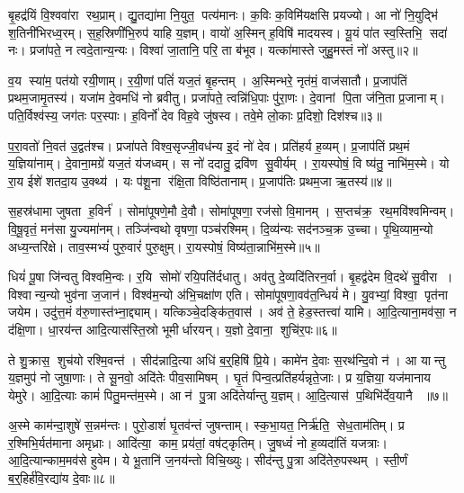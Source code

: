 बृ॒हद्र॑यिं वि॒श्ववा॑रा रथ॒प्राम्।
द्यु॒तद्या॑मा नि॒युत॒ पत्य॑मानः।
क॒विः क॒विमि॑यक्षसि प्रयज्यो।
आ नो॑ नि॒युद्भि॑ श॒तिनी॑भिरध्व॒रम्।
स॒ह॒स्रिणी॑भि॒रुप॑ याहि य॒ज्ञम्।
वायो॑ अ॒स्मिन् ह॒विषि॑ मादयस्व।
यू॒यं पा॑त स्व॒स्तिभि॒ सदा॑ नः।
प्रजा॑पते॒ न त्वदे॒तान्य॒न्यः।
विश्वा॑ जा॒तानि॒ परि॒ ता ब॑भूव।
यत्का॑मास्ते जुहु॒मस्तं नो॑ अस्तु॥२॥

व॒य स्या॑म॒ पत॑यो रयी॒णाम्।
र॒यी॒णां पतिं॑ यज॒तं बृ॒हन्तम्।
अ॒स्मिन्भरे॒ नृत॑मं॒ वाज॑सातौ।
प्र॒जाप॑तिं प्रथम॒जामृ॒तस्य॑।
यजा॑म दे॒वमधि॑ नो ब्रवीतु।
प्रजा॑पते॒ त्वन्नि॑धि॒पाः पु॑रा॒णः।
दे॒वानां पि॒ता ज॑नि॒ता प्र॒जानाम्।
पति॒र्विश्व॑स्य॒ जग॑तः पर॒स्पाः।
ह॒विर्नो॑ देव विह॒वे जु॑षस्व।
तवे॒मे लो॒काः प्र॒दिशो॒ दिश॑श्च॥३॥

प॒रा॒वतो॑ नि॒वत॑ उ॒द्वत॑श्च।
प्रजा॑पते विश्व॒सृज्जी॒वध॑न्य इ॒दं नो॑ देव।
प्रति॑हर्य ह॒व्यम्।
प्र॒जाप॑तिं प्रथ॒मं य॒ज्ञिया॑नाम्।
दे॒वाना॒मग्रे॑ यज॒तं य॑जध्वम्।
स नो॑ ददातु॒ द्रवि॑ण सु॒वीर्यम्।
रा॒यस्पोषं॒ वि ष्य॑तु॒ नाभि॑म॒स्मे।
यो रा॒य ईशे॑ शतदा॒य उ॒क्थ्य॑।
यः प॑शू॒ना र॑क्षि॒ता विष्ठि॑तानाम्।
प्र॒जाप॑तिः प्रथम॒जा ऋ॒तस्य॑॥४॥

स॒हस्र॑धामा जुषता ह॒विर्न॑।
सोमा॑पूषणे॒मौ दे॒वौ।
सोमा॑पूषणा॒ रज॑सो वि॒मानम्।
स॒प्तच॑क्र॒ रथ॒मवि॑श्वमिन्वम्।
वि॒षू॒वृतं॒ मन॑सा यु॒ज्यमा॑नम्।
तञ्जि॑न्वथो वृषणा॒ पञ्च॑रश्मिम्।
दि॒व्य॑न्यः सद॑नञ्च॒क्र उ॒च्चा।
पृ॒थि॒व्याम॒न्यो अध्य॒न्तरि॑क्षे।
ताव॒स्मभ्यं॑ पुरु॒वारं॑ पुरु॒क्षुम्।
रा॒यस्पोषं॒ विष्य॑ता॒न्नाभि॑म॒स्मे॥५॥

धियं॑ पू॒षा जि॑न्वतु विश्वमि॒न्वः।
र॒यि सोमो॑ रयि॒पति॑र्दधातु।
अव॑तु दे॒व्यदि॑तिरन॒र्वा।
बृ॒हद्व॑देम वि॒दथे॑ सु॒वीरा।
विश्वान्य॒न्यो भुव॑ना ज॒जान॑।
विश्व॑म॒न्यो अ॑भि॒चक्षा॑ण एति।
सोमा॑पूषणा॒वव॑त॒न्धियं॑ मे।
यु॒वभ्यां॒ विश्वा॒ पृत॑ना जयेम।
उदु॑त्त॒मं व॑रु॒णास्त॑भ्ना॒द्द्याम्।
यत्किञ्चे॒दङ्कि॑त॒वास॑।
अव॑ ते॒ हेड॒स्तत्त्वा॑ यामि।
आ॒दि॒त्याना॒मव॑सा॒ न द॑क्षि॒णा।
धा॒रय॑न्त आदि॒त्यास॑स्ति॒स्रो भूमीर्धारयन्।
य॒ज्ञो दे॒वाना॒ शुचि॑र॒पः॥६॥\anuvakamend[म॒नी॒षाऽस्तु॑ च॒र्तस्या॒स्मे कि॑त॒वास॑श्च॒त्वारि॑ च]

ते शु॒क्रास॒ शुच॑यो रश्मि॒वन्त॑।
सीद॑न्नादि॒त्या अधि॑ ब॒र्॒हिषि॑ प्रि॒ये।
कामे॑न दे॒वाः स॒रथ॑न्दि॒वो न॑।
आ यान्तु य॒ज्ञमुप॑ नो जुषा॒णाः।
ते सू॒नवो॒ अदि॑तेः पीव॒सामिषम्।
घृ॒तं पिन्व॒त्प्रति॑हर्यन्नृते॒जाः।
प्र य॒ज्ञिया॒ यज॑मानाय येमुरे।
आ॒दि॒त्याः कामं॑ पितु॒मन्त॑म॒स्मे।
आ न॑ पु॒त्रा अदि॑तेर्यान्तु य॒ज्ञम्।
आ॒दि॒त्यास॑ प॒थिभि॑र्देव॒यानै ॥७॥

अ॒स्मे काम॑न्दा॒शुषे॑ स॒न्नम॑न्तः।
पुरो॒डाशं॑ घृ॒तव॑न्तं जुषन्ताम्।
स्क॒भा॒यत॒ निर्\mbox{}ऋ॑ति॒ सेध॒ताम॑तिम्।
प्र र॒श्मिभि॒र्यत॑माना अमृध्राः।
आदि॑त्या॒ काम॒ प्रय॑तां॒ वष॑ट्कृतिम्।
जु॒षध्वं॑ नो ह॒व्यदा॑तिं यजत्राः।
आ॒दि॒त्यान्काम॒मव॑से हुवेम।
ये भू॒तानि॑ ज॒नय॑न्तो विचि॒ख्युः।
सीद॑न्तु पु॒त्रा अदि॑तेरु॒पस्थम्।
स्ती॒र्णं ब॒र्॒हिर्\mbox{}ह॑वि॒रद्या॑य दे॒वाः॥८॥

